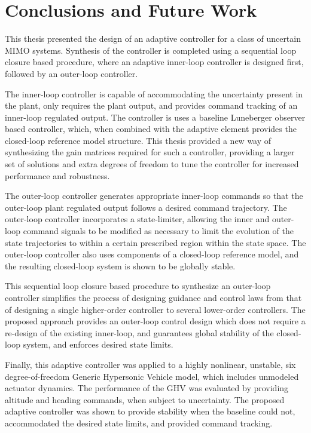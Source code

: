 \chapter{Conclusions and Future Work}\label{ch.conclusions}

This thesis presented the design of an adaptive controller for a class of uncertain MIMO systems.
Synthesis of the controller is completed using a sequential loop closure based procedure, where an adaptive inner-loop controller is designed first, followed by an outer-loop controller.

The inner-loop controller is capable of accommodating the uncertainty present in the plant, only requires the plant output, and provides command tracking of an inner-loop regulated output.
The controller is uses a baseline Luneberger observer based controller, which, when combined with the adaptive element provides the closed-loop reference model structure.
This thesis provided a new way of synthesizing the gain matrices required for such a controller, providing a larger set of solutions and extra degrees of freedom to tune the controller for increased performance and robustness.

The outer-loop controller generates appropriate inner-loop commands so that the outer-loop plant regulated output follows a desired command trajectory.
The outer-loop controller incorporates a state-limiter, allowing the inner and outer-loop command signals to be modified as necessary to limit the evolution of the state trajectories to within a certain prescribed region within the state space.
The outer-loop controller also uses components of a closed-loop reference model, and the resulting closed-loop system is shown to be globally stable.

This sequential loop closure based procedure to synthesize an outer-loop controller simplifies the process of designing guidance and control laws from that of designing a single higher-order controller to several lower-order controllers.
The proposed approach provides an outer-loop control design which does not require a re-design of the existing inner-loop, and guarantees global stability of the closed-loop system, and enforces desired state limits.

Finally, this adaptive controller was applied to a highly nonlinear, unstable, six degree-of-freedom Generic Hypersonic Vehicle model, which includes unmodeled actuator dynamics.
The performance of the GHV was evaluated by providing altitude and heading commands, when subject to uncertainty.
The proposed adaptive controller was shown to provide stability when the baseline could not, accommodated the desired state limits, and provided command tracking.

